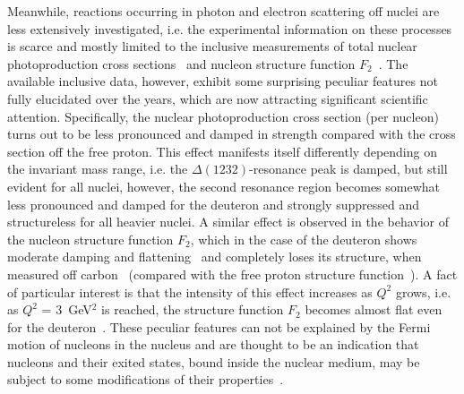 Meanwhile, reactions occurring in photon and electron scattering off nuclei are less extensively investigated, i.e. the experimental information on these processes is scarce and mostly limited to the inclusive measurements of total nuclear photoproduction cross sections~\cite{Mokeev:1995fy,Bianchi:1994ax,Ahrens:1986hn} and nucleon structure function $F_{2}$~\cite{Osipenko_2005_note,Osipenko:2005gt,Osipenko:2010sb}. The available inclusive data, however, exhibit some surprising peculiar features not fully elucidated over the years, which are now attracting significant scientific attention. Specifically, the nuclear photoproduction cross section (per nucleon) turns out to be less pronounced and damped in strength compared with the cross section off the free proton. This effect manifests itself differently depending on the invariant mass range, i.e. the $\Delta(1232)$-resonance peak is damped, but still evident for all nuclei, however, the second resonance region becomes somewhat less pronounced and damped for the deuteron and strongly suppressed and structureless for all heavier nuclei. A similar effect is observed in the behavior of the nucleon structure function $F_{2}$, which in the case of the deuteron shows moderate damping and flattening~\cite{Osipenko:2005gt} and completely loses its structure, when measured off carbon~\cite{Osipenko:2010sb} (compared with the free proton structure function~\cite{Osipenko:2003bu}). A fact of particular interest is that the intensity of this effect increases as $Q^{2}$ grows, i.e. as $Q^{2}$ = 3~GeV$^{2}$ is reached, the structure function $F_{2}$ becomes almost flat even for the deuteron~\cite{Osipenko:2010sb}. These peculiar features can not be explained by the Fermi motion of nucleons in the nucleus and are thought to be an indication that nucleons and their exited states, bound inside the nuclear medium, may be subject to some modifications of their properties~\cite{Mokeev:1995fy,Bianchi:1994ax,Ahrens:1986hn,Krusche:2004xz,Noble:1980my}. 








